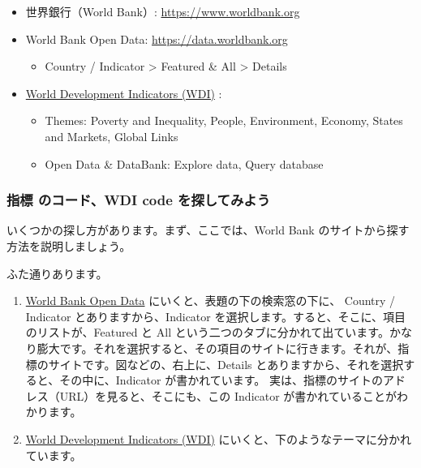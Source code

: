 \documentclass[
]{bxjsbook}
\providecommand{\tightlist}{%
  \setlength{\itemsep}{0pt}\setlength{\parskip}{0pt}}
\theoremstyle{definition}
\theoremstyle{definition}
\theoremstyle{definition}
\theoremstyle{definition}
\theoremstyle{remark}
\begin{document}
\begin{itemize}
\tightlist
\item
  世界銀行（World Bank）: \url{https://www.worldbank.org}
\item
  World Bank Open Data: \url{https://data.worldbank.org}

  \begin{itemize}
  \tightlist
  \item
    Country / Indicator \textgreater{} Featured \& All \textgreater{} Details
  \end{itemize}
\item
  \href{https://datatopics.worldbank.org/world-development-indicators/}{World Development Indicators (WDI)} :

  \begin{itemize}
  \tightlist
  \item
    Themes: Poverty and Inequality, People, Environment, Economy, States and Markets, Global Links
  \item
    Open Data \& DataBank: Explore data, Query database
  \end{itemize}
\end{itemize}

\hypertarget{ux6307ux6a19-ux306eux30b3ux30fcux30c9wdi-code-ux3092ux63a2ux3057ux3066ux307fux3088ux3046}{%
\subsubsection{指標 のコード、WDI code を探してみよう}\label{ux6307ux6a19-ux306eux30b3ux30fcux30c9wdi-code-ux3092ux63a2ux3057ux3066ux307fux3088ux3046}}

いくつかの探し方があります。まず、ここでは、World Bank のサイトから探す方法を説明しましょう。

ふた通りあります。

\begin{enumerate}
\def\labelenumi{\arabic{enumi}.}
\item
  \href{https://data.worldbank.org}{World Bank Open Data} にいくと、表題の下の検索窓の下に、 Country / Indicator とありますから、Indicator を選択します。すると、そこに、項目のリストが、Featured と All という二つのタブに分かれて出ています。かなり膨大です。それを選択すると、その項目のサイトに行きます。それが、指標のサイトです。図などの、右上に、Details とありますから、それを選択すると、その中に、Indicator が書かれています。
  実は、指標のサイトのアドレス（URL）を見ると、そこにも、この Indicator が書かれていることがわかります。
\item
  \href{https://datatopics.worldbank.org/world-development-indicators/}{World Development Indicators (WDI)} にいくと、下のようなテーマに分かれています。
\end{enumerate}
\end{document}
